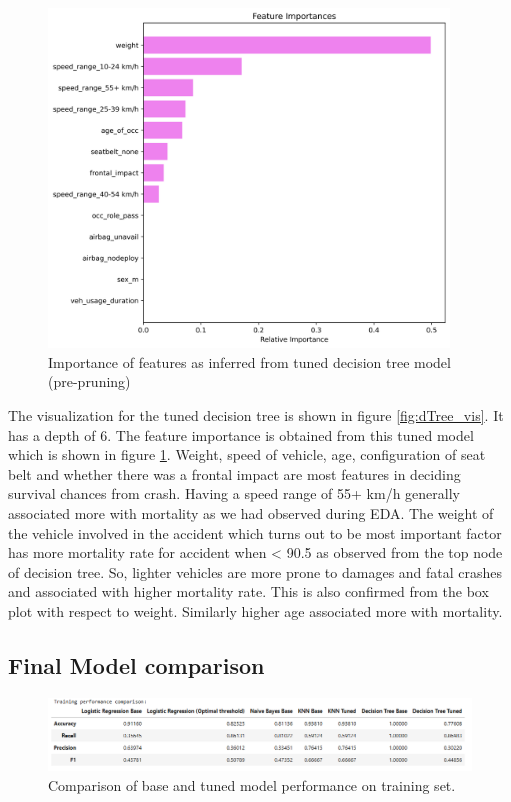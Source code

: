 \documentclass[12pt,a4paper]{article}
\begin{document}
	\begin{figure}[h]
		\centering
		\includegraphics[width=\linewidth,height=9cm]{_feat_importance.png}
		\caption{Importance of features as inferred from tuned decision tree model (pre-pruning)}
		\label{fig:feat_imp}
	\end{figure}
	The visualization for the tuned decision tree is shown in figure \ref{fig:dTree_vis}. It has a depth of 6. The feature importance is obtained from this tuned model which is shown in figure \ref{fig:feat_imp}. Weight, speed of vehicle, age, configuration of seat belt and whether there was a frontal impact are most features in deciding survival chances from crash. Having a speed range of 55+ km/h generally associated more with mortality as we had observed during EDA. The weight of the vehicle involved in the accident which turns out to be most important factor has more mortality rate for accident when < 90.5 as observed from the top node of decision tree. So, lighter vehicles are more prone to damages and fatal crashes and associated with higher mortality rate. This is also confirmed from the box plot with respect to weight. Similarly higher age associated more with mortality.
	\clearpage
	\subsection{Final Model comparison}
	\begin{figure}[h]
		\centering
		\includegraphics[width=\linewidth]{training_perf_compare.png}
		\caption{Comparison of base and tuned model performance on training set.}
		\label{fig:training_perf_copmpare}
	\end{figure}
\end{document}
